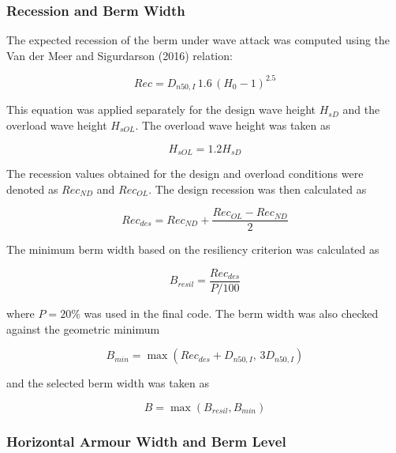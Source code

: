 \documentclass[a4paper, 11pt]{article}
\begin{document}
\subsubsection{Recession and Berm Width}

\hspace*{0.5cm} The expected recession of the berm under wave attack was computed using the Van der Meer and Sigurdarson (2016) relation:

\begin{equation}
    Rec = D_{n50,I}\,1.6\,(H_0-1)^{2.5}
    \label{eq:berm_recession}
\end{equation}

This equation was applied separately for the design wave height \(H_{sD}\) and the overload wave height \(H_{sOL}\). The overload wave height was taken as

\begin{equation}
    H_{sOL}=1.2H_{sD}
\end{equation}

The recession values obtained for the design and overload conditions were denoted as \(Rec_{ND}\) and \(Rec_{OL}\). The design recession was then calculated as

\begin{equation}
    Rec_{des}=Rec_{ND}+\frac{Rec_{OL}-Rec_{ND}}{2}
    \label{eq:berm_rec_des}
\end{equation}

The minimum berm width based on the resiliency criterion was calculated as

\begin{equation}
    B_{resil}=\frac{Rec_{des}}{P/100}
    \label{eq:berm_width_resil}
\end{equation}

where \(P=20\%\) was used in the final code. The berm width was also checked against the geometric minimum

\begin{equation}
    B_{min}=\max(Rec_{des}+D_{n50,I},\,3D_{n50,I})
    \label{eq:berm_width_min}
\end{equation}

and the selected berm width was taken as

\begin{equation}
    B=\max(B_{resil},B_{min})
    \label{eq:berm_width_final}
\end{equation}

\subsubsection{Horizontal Armour Width and Berm Level}
\end{document}

